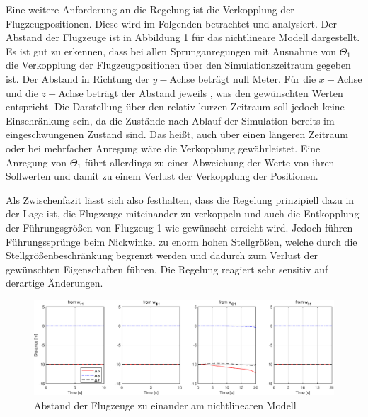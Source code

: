 Eine weitere Anforderung an die Regelung ist die Verkopplung der Flugzeugpositionen. Diese wird im Folgenden betrachtet und analysiert. Der Abstand der Flugzeuge ist in Abbildung \ref{fig:distance_xyz_nlinear} für das nichtlineare Modell dargestellt. Es ist gut zu erkennen, dass bei allen Sprunganregungen mit Ausnahme von $\Theta_1$ die Verkopplung der Flugzeugpositionen über den Simulationszeitraum gegeben ist. Der Abstand in Richtung der $y-$Achse beträgt null Meter. Für die $x-$Achse und die $z-$Achse beträgt der Abstand jeweils , was den gewünschten Werten entspricht. Die Darstellung über den relativ kurzen Zeitraum soll jedoch keine Einschränkung sein, da die Zustände nach Ablauf der Simulation bereits im eingeschwungenen Zustand sind. Das heißt, auch über einen längeren Zeitraum oder bei mehrfacher Anregung wäre die Verkopplung gewährleistet. Eine Anregung von $\Theta_1$ führt allerdings zu einer Abweichung der Werte von ihren Sollwerten und damit zu einem Verlust der Verkopplung der Positionen. 

Als Zwischenfazit lässt sich also festhalten, dass die Regelung prinzipiell dazu in der Lage ist, die Flugzeuge miteinander zu verkoppeln und auch die Entkopplung der Führungsgrößen von Flugzeug 1 wie gewünscht erreicht wird. Jedoch führen Führungssprünge beim Nickwinkel zu enorm hohen Stellgrößen, welche durch die Stellgrößenbeschränkung begrenzt werden und dadurch zum Verlust der gewünschten Eigenschaften führen. Die Regelung reagiert sehr sensitiv auf derartige Änderungen.

\begin{figure}[h] %
	\centering
	\includegraphics[width=\linewidth]{./Bilder/distance_xyz_nlinear.eps}
	\caption{Abstand der Flugzeuge zu einander am nichtlinearen Modell}
	\label{fig:distance_xyz_nlinear}
\end{figure}

